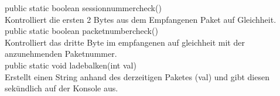 \documentclass[12pt]{article}
\begin{document}
public static boolean sessionnummercheck()\\
Kontrolliert die ersten 2 Bytes aus dem Empfangenen Paket auf Gleichheit.\\

public static boolean packetnumbercheck()\\
Kontrolliert das dritte Byte im empfangenen auf gleichheit mit der anzunehmenden Paketnummer.\\

public static void ladebalken(int val)\\
Erstellt einen String anhand des derzeitigen Paketes (val) und gibt diesen sekündlich auf der Konsole aus.\\
\end{document}
